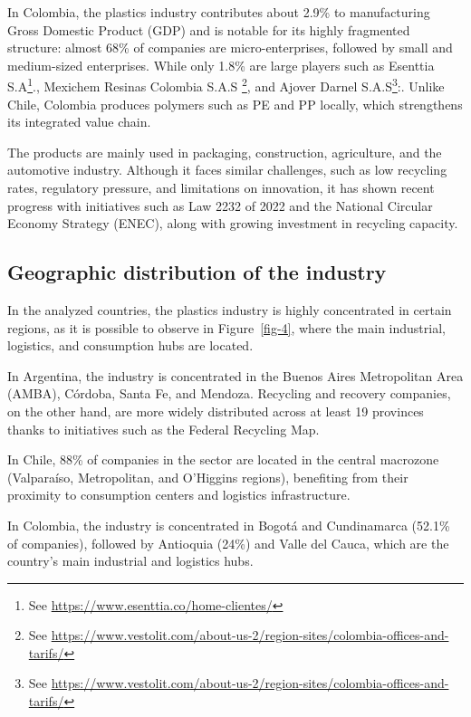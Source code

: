 \documentclass[
  12pt,
  oneside]{book}
\begin{document}
In Colombia, the plastics industry contributes about 2.9\% to
manufacturing Gross Domestic Product (GDP) and is notable for its highly
fragmented structure: almost 68\% of companies are micro-enterprises,
followed by small and medium-sized enterprises. While only 1.8\% are
large players such as Esenttia S.A\footnote{See
  \href{https://www.esenttia.co/home-clientes/}{https://www.esenttia.co/home-clientes/}}.,
Mexichem Resinas Colombia S.A.S \footnote{See
  \href{https://www.vestolit.com/about-us-2/region-sites/colombia-offices-and-tarifs/}{https://www.vestolit.com/about-us-2/region-sites/colombia-offices-and-tarifs/}},
and Ajover Darnel S.A.S\footnote{See
  \href{https://www.vestolit.com/about-us-2/region-sites/colombia-offices-and-tarifs/}{https://www.vestolit.com/about-us-2/region-sites/colombia-offices-and-tarifs/}}:.
Unlike Chile, Colombia produces polymers such as PE and PP locally,
which strengthens its integrated value chain.

The products are mainly used in packaging, construction, agriculture,
and the automotive industry. Although it faces similar challenges, such
as low recycling rates, regulatory pressure, and limitations on
innovation, it has shown recent progress with initiatives such as Law
2232 of 2022 and the National Circular Economy Strategy (ENEC), along
with growing investment in recycling capacity.

\subsection{Geographic distribution of the
industry}\label{geographic-distribution-of-the-industry}

In the analyzed countries, the plastics industry is highly concentrated
in certain regions, as it is possible to observe in Figure~\ref{fig-4},
where the main industrial, logistics, and consumption hubs are located.

In Argentina, the industry is concentrated in the Buenos Aires
Metropolitan Area (AMBA), Córdoba, Santa Fe, and Mendoza. Recycling and
recovery companies, on the other hand, are more widely distributed
across at least 19 provinces thanks to initiatives such as the Federal
Recycling Map.

In Chile, 88\% of companies in the sector are located in the central
macrozone (Valparaíso, Metropolitan, and O'Higgins regions), benefiting
from their proximity to consumption centers and logistics
infrastructure.

In Colombia, the industry is concentrated in Bogotá and Cundinamarca
(52.1\% of companies), followed by Antioquia (24\%) and Valle del Cauca,
which are the country's main industrial and logistics hubs.
\end{document}
